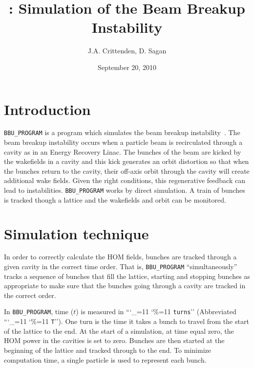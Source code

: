 \documentclass[11pt]{article}
\title{ {\bbup}: Simulation of the Beam Breakup Instability}
\author{J.A. Crittenden, D. Sagan}
\date{September 20, 2010}
\newcommand{\bbup}{\texttt{BBU_PROGRAM}\xspace}
\newcommand\ttcmd{\begingroup\catcode`\_=11 \catcode`\%=11 \dottcmd}
\newcommand\dottcmd[1]{\texttt{#1}\endgroup}
\newcommand{\vn}{\ttcmd}
\begin{document}
\maketitle

\section{Introduction} 

\bbup is a program which simulates the beam breakup
instability~\cite{ref:Hoffstaetter04}. The beam breakup instability
occurs when a particle beam is recirculated through a cavity as in an
Energy Recovery Linac. The bunches of the beam are kicked by the
wakefields in a cavity and this kick generates an orbit distortion so
that when the bunches return to the cavity, their off-axis orbit
through the cavity will create additional wake fields. Given the right
conditions, this regenerative feedback can lead to instabilities.
\bbup works by direct simulation. A train of bunches is tracked though 
a lattice and the wakefields and orbit can be monitored.

\section{Simulation technique}

In order to correctly calculate the HOM fields, bunches are tracked
through a given cavity in the correct time order. That is, \bbup
``simultaneously'' tracks a sequence of bunches that fill the lattice,
starting and stopping bunches as appropriate to make sure that the
bunches going through a cavity are tracked in the correct order.

In \bbup, time ($t$) is measured in ``\vn{turns}'' (Abbreviated
``\vn{T}''). One turn is the time it takes a bunch to travel from the
start of the lattice to the end. At the start of a simulation, at time
equal zero, the HOM power in the cavities is set to zero. Bunches are
then started at the beginning of the lattice and tracked through to
the end. To minimize computation time, a single particle is used to
represent each bunch. 
\end{document}
